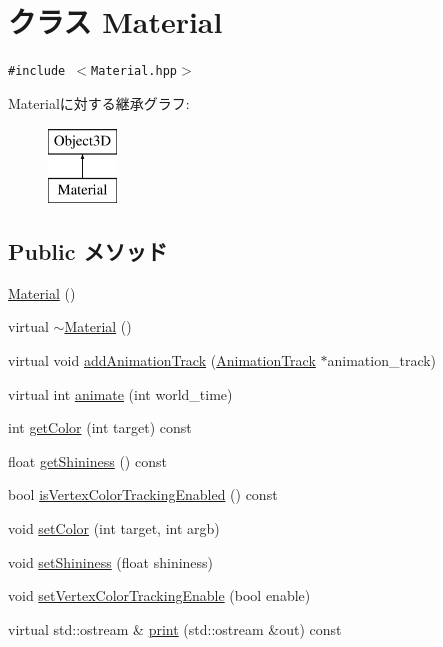 \hypertarget{classm3g_1_1Material}{
\section{クラス Material}
\label{classm3g_1_1Material}
}
{\tt \#include $<$Material.hpp$>$}

Materialに対する継承グラフ:\begin{figure}[H]
\begin{center}
\leavevmode
\includegraphics[height=2cm]{classm3g_1_1Material}
\end{center}
\end{figure}
\subsection*{Public メソッド}
\begin{CompactItemize}
\item 
\hyperlink{classm3g_1_1Material_ade2019060d01e7983e9bc40ea6aa404}{Material} ()
\item 
virtual \hyperlink{classm3g_1_1Material_b15b7efa255e5cca9b02a031a783cfe8}{$\sim$Material} ()
\item 
virtual void \hyperlink{classm3g_1_1Material_415c0b110f95410ded9b85e5d99a496b}{addAnimationTrack} (\hyperlink{classm3g_1_1AnimationTrack}{AnimationTrack} $\ast$animation\_\-track)
\item 
virtual int \hyperlink{classm3g_1_1Material_8aad1ceab4c2a03609c8a42324ce484d}{animate} (int world\_\-time)
\item 
int \hyperlink{classm3g_1_1Material_d5740043584c6bf87bf014402c5985be}{getColor} (int target) const 
\item 
float \hyperlink{classm3g_1_1Material_1bab082fe3510dbe7b98dd07b3976b5b}{getShininess} () const 
\item 
bool \hyperlink{classm3g_1_1Material_64fb5d60325fd073ab623d0eb04189d1}{isVertexColorTrackingEnabled} () const 
\item 
void \hyperlink{classm3g_1_1Material_5947a525a18bca77aa890971df2ae48a}{setColor} (int target, int argb)
\item 
void \hyperlink{classm3g_1_1Material_fb630e98bef48acb3b3c0541ed3615be}{setShininess} (float shininess)
\item 
void \hyperlink{classm3g_1_1Material_55778ceeb6408e5db698c793dea1edd6}{setVertexColorTrackingEnable} (bool enable)
\item 
virtual std::ostream \& \hyperlink{classm3g_1_1Material_6fea17fa1532df3794f8cb39cb4f911f}{print} (std::ostream \&out) const 
\end{CompactItemize}
